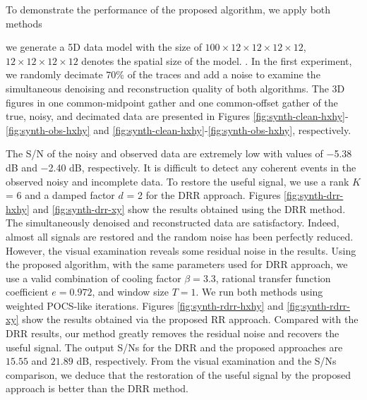 To demonstrate the performance of the proposed algorithm, we apply both methods    

 we generate a 5D data model with the size of $100 \times 12 \times 12 \times 12 \times 12$,  $12 \times 12 \times 12 \times 12$ denotes the spatial size of the model. . In the first experiment, we randomly decimate $70\%$ of the traces and add a noise  to examine the simultaneous denoising and reconstruction quality of both algorithms. The 3D figures in one common-midpoint gather  and one common-offset gather  of the true, noisy, and decimated data are presented in Figures \ref{fig:synth-clean-hxhy}-\ref{fig:synth-obs-hxhy} and \ref{fig:synth-clean-hxhy}-\ref{fig:synth-obs-hxhy}, respectively. 

The S/N of the noisy and observed data are extremely low with values of {$-$5.38 dB} and {$-$2.40 dB}, respectively. It is difficult to detect any coherent events in the observed noisy and incomplete data. To restore the useful signal, we use a rank {$K$ = 6} and a damped factor {$d$ = 2} for the DRR approach. Figures \ref{fig:synth-drr-hxhy} and \ref{fig:synth-drr-xy} show the results obtained using the DRR method. The simultaneously denoised and reconstructed data are satisfactory. Indeed, almost all signals are restored and the random noise has been perfectly reduced. However, the visual examination reveals some residual noise in the results. Using the proposed algorithm, with the same parameters used for DRR approach, we use a valid combination of cooling factor ${\beta = 3.3}$, rational transfer function coefficient ${e = 0.972}$, and window size ${T = 1}$. We run both methods using  weighted POCS-like iterations. Figures \ref{fig:synth-rdrr-hxhy} and \ref{fig:synth-rdrr-xy} show the results obtained via the proposed RR approach. Compared with the DRR results, our method greatly removes the residual noise and recovers the useful signal. The output S/Ns for the DRR and the proposed approaches are {$15.55$} and {$21.89$ dB}, respectively. From the visual examination and the S/Ns comparison, we deduce that the restoration of the useful signal by the proposed approach is better than the DRR method.

